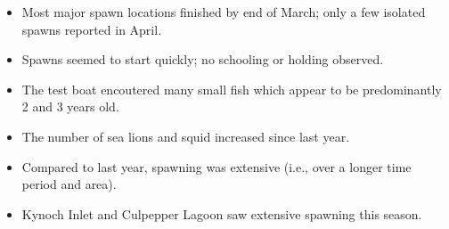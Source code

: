 \begin{itemize}
\item Most major spawn locations finished by end of March; only a few isolated spawns reported in April.
\item Spawns seemed to start quickly; no schooling or holding observed.
\item The test boat encoutered many small fish which appear to be predominantly 2 and 3 years old.
\item The number of sea lions and squid increased since last year.
\item Compared to last year, spawning was extensive (i.e., over a longer time period and area).
\item Kynoch Inlet and Culpepper Lagoon saw extensive spawning this season.
\end{itemize}